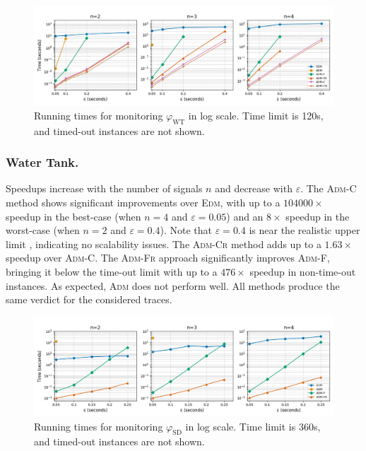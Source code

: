 \begin{figure}[t]
	\begin{center}
		\includegraphics[width=\linewidth]{wt_newnames.png}
		\caption{Running times for monitoring $\varphi_{\text{WT}}$ in log scale. Time limit is 120s, and timed-out instances are not shown.}
	\end{center}
\end{figure}

\subsubsection{Water Tank.}
Speedups increase with the number of signals \(n\) and decrease with \(\varepsilon\).
The \textsc{Adm-C} method shows significant improvements over \textsc{Edm}, with up to a $104000\times$ speedup in the best-case (when \(n=4\) and \(\varepsilon=0.05\)) and an $8\times$ speedup in the worst-case (when \(n=2\) and \(\varepsilon=0.4\)).
Note that \(\varepsilon=0.4\) is near the realistic upper limit \cite{MomtazAB23}, indicating no scalability issues.
The \textsc{Adm-Cr} method adds up to a $1.63\times$ speedup over \textsc{Adm-C}.
The \textsc{Adm-Fr} approach significantly improves \textsc{Adm-F}, bringing it below the time-out limit with up to a $476\times$ speedup in non-time-out instances.
As expected, \textsc{Adm} does not perform well.
All methods produce the same verdict for the considered traces.

\begin{figure}[t]
	\begin{center}
		\includegraphics[width=\linewidth]{ms_newnames.png}
		\caption{Running times for monitoring $\varphi_{\text{SD}}$ in log scale. Time limit is 360s, and timed-out instances are not shown.}
	\end{center}
\end{figure}

